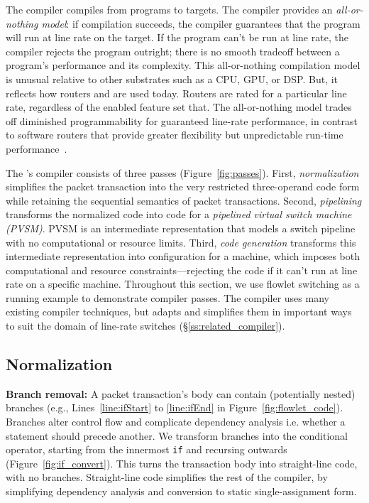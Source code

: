 The \pktlanguage compiler compiles from \pktlanguage programs to \absmachine
targets. The compiler provides an {\em all-or-nothing model}: if compilation
succeeds, the compiler guarantees that the program will run at line rate on the
target. If the program can't be run at line rate, the compiler rejects the
program outright; there is no smooth tradeoff between a program's performance
and its complexity.  This all-or-nothing compilation model is unusual relative
to other substrates such as a CPU, GPU, or DSP. But, it reflects how routers
and are used today. Routers are rated for a particular line rate, regardless of
the enabled feature set that. The all-or-nothing model trades off diminished
programmability for guaranteed line-rate performance, in contrast to software
routers that provide greater flexibility but unpredictable run-time
performance~\cite{dobrescu2012, wenfei15}.

The \pktlanguage's compiler consists of three passes (Figure~\ref{fig:passes}).
First, \textit{normalization} simplifies the packet transaction into the very
restricted three-operand code form while retaining the sequential semantics of
packet transactions. Second, \textit{pipelining} transforms the normalized code
into code for a \textit{pipelined virtual switch machine (PVSM)}. PVSM is an
intermediate representation that models a switch pipeline with no computational
or resource limits. Third, \textit{code generation} transforms this
intermediate representation into configuration for a \absmachine machine, which
imposes both computational and resource constraints---rejecting the code if it
can't run at line rate on a specific \absmachine machine. Throughout this
section, we use flowlet switching as a running example to demonstrate compiler
passes. The \pktlanguage compiler uses many existing compiler techniques, but
adapts and simplifies them in important ways to suit the domain of line-rate
switches (\S\ref{ss:related_compiler}).

\subsection{Normalization}
\label{ss:normalization}

\textbf{Branch removal: }A packet transaction's body can contain (potentially
nested) branches (e.g., Lines~\ref{line:ifStart} to \ref{line:ifEnd} in
Figure~\ref{fig:flowlet_code}).  Branches alter control flow and complicate
dependency analysis i.e.  whether a statement should precede another.  We
transform branches into the conditional operator, starting from the innermost
\texttt{if} and recursing outwards (Figure~\ref{fig:if_convert}).  This turns
the transaction body into straight-line code, with no branches.  Straight-line
code simplifies the rest of the compiler, by simplifying dependency analysis
and conversion to static single-assignment form.

